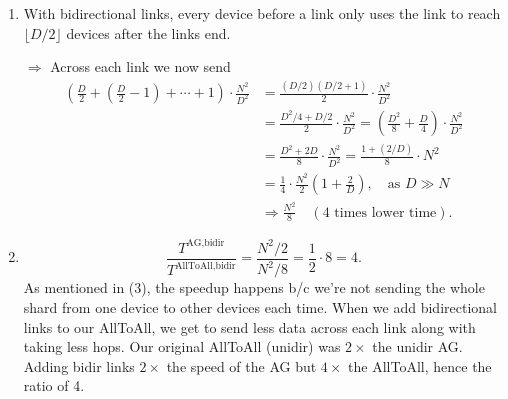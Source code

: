 \documentclass[11pt]{article}
\begin{document}
\begin{enumerate}
  \item With bidirectional links, every device before a link only uses the link to reach $\lfloor D/2 \rfloor$ devices after the links end.

  $\Rightarrow$ Across each link we now send
  \begin{align*}
  \left(\frac{D}{2} + \left(\frac{D}{2} - 1\right) + \cdots + 1\right) \cdot \frac{N^2}{D^2}
  &= \frac{(D/2)(D/2 + 1)}{2} \cdot \frac{N^2}{D^2} \\
  &= \frac{D^2/4 + D/2}{2} \cdot \frac{N^2}{D^2}
  = \left(\frac{D^2}{8} + \frac{D}{4}\right) \cdot \frac{N^2}{D^2} \\
  &= \frac{D^2 + 2D}{8} \cdot \frac{N^2}{D^2}
  = \frac{1 + (2/D)}{8} \cdot N^2 \\
  &= \frac{1}{4} \cdot \frac{N^2}{2}\left(1 + \frac{2}{D}\right), \quad\text{as } D \gg N \\
  &\Rightarrow \frac{N^2}{8} \quad (\text{4 times lower time}).
  \end{align*}

  \item
  \[
  \frac{T^{\text{AG,bidir}}}{T^{\text{AllToAll,bidir}}} = \frac{N^2 / 2}{N^2 / 8} = \frac{1}{2} \cdot 8 = 4.
  \]
  As mentioned in (3), the speedup happens b/c we're not sending the whole shard from one device to other devices each time. When we add bidirectional links to our AllToAll, we get to send less data across each link along with taking less hops. Our original AllToAll (unidir) was $2\times$ the unidir AG. Adding bidir links $2\times$ the speed of the AG but $4\times$ the AllToAll, hence the ratio of 4.
\end{enumerate}
\end{document}
